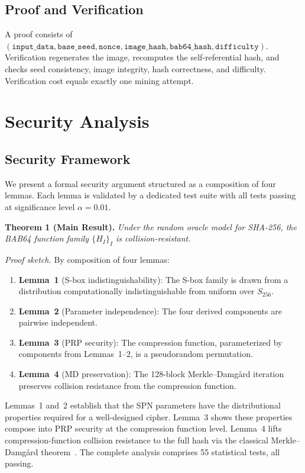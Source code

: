 \documentclass[preprint]{iacrtrans}
\begin{document}
\subsection{Proof and Verification}

A proof consists of $(\texttt{input\_data}, \texttt{base\_seed}, \texttt{nonce}, \texttt{image\_hash}, \texttt{bab64\_hash}, \texttt{difficulty})$. Verification regenerates the image, recomputes the self-referential hash, and checks seed consistency, image integrity, hash correctness, and difficulty. Verification cost equals exactly one mining attempt.

\section{Security Analysis}

\subsection{Security Framework}

We present a formal security argument structured as a composition of four lemmas. Each lemma is validated by a dedicated test suite with all tests passing at significance level $\alpha = 0.01$.

\medskip
\noindent\textbf{Theorem 1 (Main Result).} \emph{Under the random oracle model for SHA-256, the BAB64 function family $\{H_I\}_I$ is collision-resistant.}

\medskip
\noindent\emph{Proof sketch.} By composition of four lemmas:
\begin{enumerate}
    \item \textbf{Lemma~1} (S-box indistinguishability): The S-box family is drawn from a distribution computationally indistinguishable from uniform over $S_{256}$.
    \item \textbf{Lemma~2} (Parameter independence): The four derived components are pairwise independent.
    \item \textbf{Lemma~3} (PRP security): The compression function, parameterized by components from Lemmas~1--2, is a pseudorandom permutation.
    \item \textbf{Lemma~4} (MD preservation): The 128-block Merkle--Damg{\aa}rd iteration preserves collision resistance from the compression function.
\end{enumerate}

Lemmas~1 and~2 establish that the SPN parameters have the distributional properties required for a well-designed cipher. Lemma~3 shows these properties compose into PRP security at the compression function level. Lemma~4 lifts compression-function collision resistance to the full hash via the classical Merkle--Damg{\aa}rd theorem~\cite{joux2004}. The complete analysis comprises 55 statistical tests, all passing.
\end{document}
